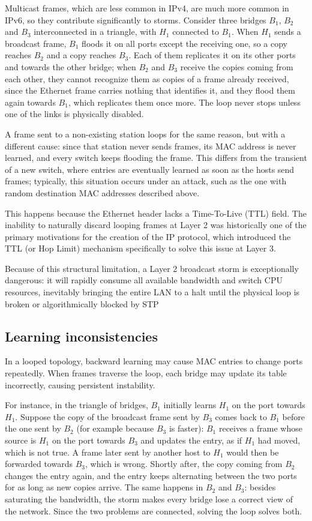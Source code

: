 \documentclass[11pt,a4paper,openany]{report}
\begin{document}
Multicast frames, which are less common in IPv4, are much more common in IPv6, so they contribute significantly to storms. Consider three bridges $B_1$, $B_2$ and $B_3$ interconnected in a triangle, with $H_1$ connected to $B_1$. When $H_1$ sends a broadcast frame, $B_1$ floods it on all ports except the receiving one, so a copy reaches $B_2$ and a copy reaches $B_3$. Each of them replicates it on its other ports and towards the other bridge; when $B_2$ and $B_3$ receive the copies coming from each other, they cannot recognize them as copies of a frame already received, since the Ethernet frame carries nothing that identifies it, and they flood them again towards $B_1$, which replicates them once more. The loop never stops unless one of the links is physically disabled.

A frame sent to a non-existing station loops for the same reason, but with a different cause: since that station never sends frames, its MAC address is never learned, and every switch keeps flooding the frame. This differs from the transient of a new switch, where entries are eventually learned as soon as the hosts send frames; typically, this situation occurs under an attack, such as the one with random destination MAC addresses described above.




This happens because the Ethernet header lacks a Time-To-Live (TTL) field. The inability to naturally discard looping frames at Layer 2 was historically one of the primary motivations for the creation of the IP protocol, which introduced the TTL (or Hop Limit) mechanism specifically to solve this issue at Layer 3.

Because of this structural limitation, a Layer 2 broadcast storm is exceptionally dangerous: it will rapidly consume all available bandwidth and switch CPU resources, inevitably bringing the entire LAN to a halt until the physical loop is broken or algorithmically blocked by STP
\subsection{Learning inconsistencies}

In a looped topology, backward learning may cause MAC entries to change ports repeatedly. When frames traverse the loop, each bridge may update its table incorrectly, causing persistent instability.

For instance, in the triangle of bridges, $B_1$ initially learns $H_1$ on the port towards $H_1$. Suppose the copy of the broadcast frame sent by $B_3$ comes back to $B_1$ before the one sent by $B_2$ (for example because $B_3$ is faster): $B_1$ receives a frame whose source is $H_1$ on the port towards $B_3$ and updates the entry, as if $H_1$ had moved, which is not true. A frame later sent by another host to $H_1$ would then be forwarded towards $B_3$, which is wrong. Shortly after, the copy coming from $B_2$ changes the entry again, and the entry keeps alternating between the two ports for as long as new copies arrive. The same happens in $B_2$ and $B_3$: besides saturating the bandwidth, the storm makes every bridge lose a correct view of the network. Since the two problems are connected, solving the loop solves both.
\end{document}
